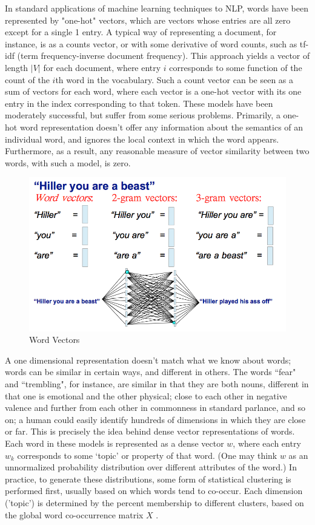 \documentclass[conference]{IEEEtran}
\begin{document}
\indent In standard applications of machine learning techniques to NLP, words have been represented by "one-hot" vectors, which are vectors whose entries are all zero except for a single 1 entry. A typical way of representing a document, for instance, is as a counts vector, or with some derivative of word counts, such as tf-idf (term frequency-inverse document frequency).  This approach yields a vector of length $|V|$ for each document, where entry $i$ corresponds to some function of the count of the $i$th word in the vocabulary.  Such a count vector can be seen as a sum of vectors for each word, where each vector is a one-hot vector with its one entry in the index corresponding to that token.  These models have been moderately successful, but suffer from some serious problems. Primarily, a one-hot word representation  doesn't offer any information about the semantics of an individual word, and ignores the local context in which the word appears. Furthermore, as a result, any reasonable measure of vector similarity between two words, with such a model, is zero.\\

\begin{figure}
	\centering
	\includegraphics[scale=0.3]{tweet_cmp_cs221.png}
	\caption{Word Vectors}
	\label{fig1}
\end{figure}

\indent A one dimensional representation doesn't match what we know about words; words can be similar in certain ways, and different in others.  The words ``fear" and ``trembling", for instance, are similar in that they are both nouns, different in that one is emotional and the other physical; close to each other in negative valence and further from each other in commonness in standard parlance, and so on; a human could easily identify hundreds of dimensions in which they are close or far.  This is precisely the idea behind dense vector representations of words. Each word in these models is represented as a dense vector $w$, where each entry $w_k$ corresponds to some `topic' or property of that word. (One may think $w$ as an unnormalized probability distribution over different attributes of the word.) In practice, to generate these distributions, some form of statistical clustering is performed first, usually based on which words tend to co-occur. Each dimension ('topic') is determined by the percent membership to different clusters, based on the global word co-occurrence matrix $X$ \cite{Wordvec}.\\
\end{document}
